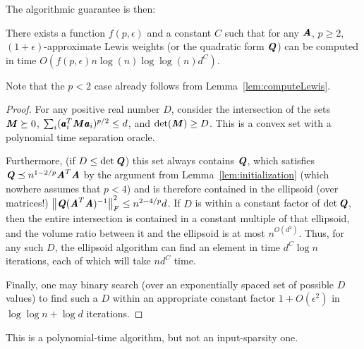 The algorithmic guarantee is then:
\begin{theorem}
\label{thm:polyslow}
There exists a function $f(p, \epsilon)$ and a constant $C$ such that for any $\AA$, $p \geq 2$,
$(1+\epsilon)$-approximate Lewis weights (or the quadratic form $\QQ$) can be computed in time $O(f(p, \epsilon) n \log(n) \log \log(n) d^C)$.
\end{theorem}
Note that the $p < 2$ case already follows from Lemma~\ref{lem:computeLewis}.
\begin{proof}
For any positive real number $D$, consider the intersection of the sets $\MM \succeq 0$,
$\sum_i (\aa_i^T \MM \aa_i)^{p/2} \leq d$, and $\det(\MM) \geq D$.  This is a convex set
with a polynomial time separation oracle.

Furthermore, (if $D \leq \det \QQ$) this set always contains $\QQ$, which satisfies
$\QQ \preceq n^{1-2/p} \AA^T \AA$ by the argument from Lemma~\ref{lem:initialization}
(which nowhere assumes that $p < 4$) and is therefore contained in the ellipsoid
(over matrices!) $\norm{\QQ (\AA^T \AA)^{-1}}_F^2 \leq n^{2-4/p} d$.  If $D$ is within a
constant factor of $\det \QQ$, then the entire intersection is contained in a constant multiple
of that ellipsoid, and the volume ratio between it and the ellipsoid is at most $n^{O(d^2)}$.
Thus, for any such $D$, the ellipsoid algorithm can find an element in time $d^C \log n$ iterations,
each of which will take $n d^C$ time.

Finally, one may binary search (over an exponentially spaced set of possible $D$ values) to find
such a $D$ within an appropriate constant factor $1+O(\epsilon^2)$ in $\log \log n + \log d$ iterations.
\end{proof}
This is a polynomial-time algorithm, but not an input-sparsity one.
